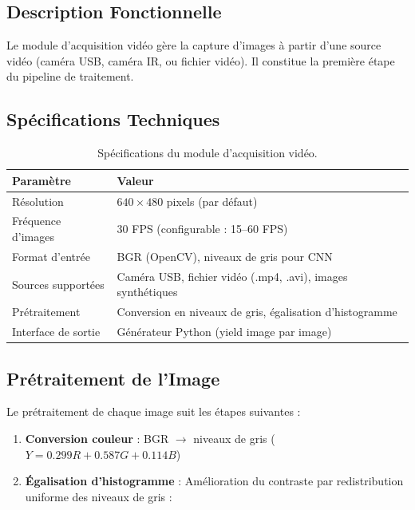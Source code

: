 \subsection{Description Fonctionnelle}

Le module d'acquisition vidéo gère la capture d'images à partir d'une source vidéo (caméra USB, caméra IR, ou fichier vidéo). Il constitue la première étape du pipeline de traitement.

\subsection{Spécifications Techniques}

\begin{table}[H]
\centering
\caption{Spécifications du module d'acquisition vidéo.}
\label{tab:video_specs}
\renewcommand{\arraystretch}{1.3}
\begin{tabular}{|l|l|}
\hline
\rowcolor{stellantisblue!15}
\textbf{Paramètre} & \textbf{Valeur} \\
\hline
Résolution & $640 \times 480$ pixels (par défaut) \\
\hline
Fréquence d'images & 30 FPS (configurable : 15--60 FPS) \\
\hline
Format d'entrée & BGR (OpenCV), niveaux de gris pour CNN \\
\hline
Sources supportées & Caméra USB, fichier vidéo (.mp4, .avi), images synthétiques \\
\hline
Prétraitement & Conversion en niveaux de gris, égalisation d'histogramme \\
\hline
Interface de sortie & Générateur Python (yield image par image) \\
\hline
\end{tabular}
\end{table}

\subsection{Prétraitement de l'Image}

Le prétraitement de chaque image suit les étapes suivantes :

\begin{enumerate}[leftmargin=2cm]
    \item \textbf{Conversion couleur} : BGR $\rightarrow$ niveaux de gris ($Y = 0.299R + 0.587G + 0.114B$)
    \item \textbf{Égalisation d'histogramme} : Amélioration du contraste par redistribution uniforme des niveaux de gris :
\end{enumerate}

